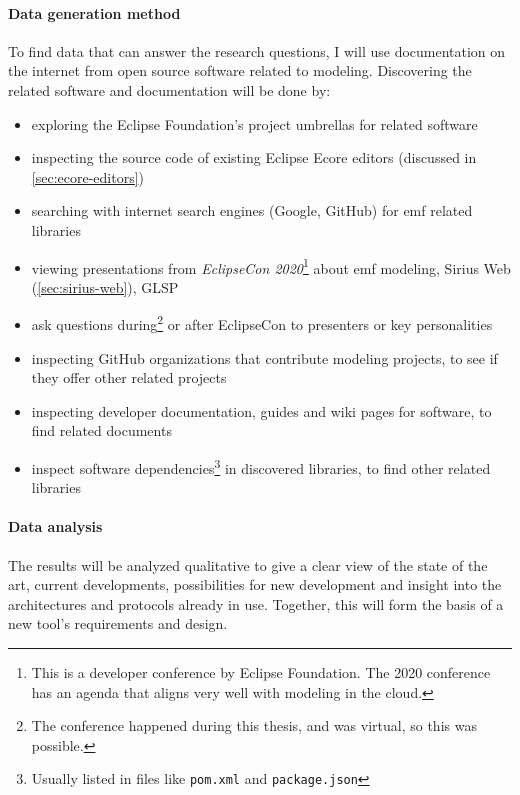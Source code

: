 \paragraph*{Data generation method}
To find data that can answer the research questions, I will use documentation on the internet from \gls{open source} software related to modeling.
Discovering the related software and documentation will be done by:
\begin{itemize}
  \item exploring the Eclipse Foundation's project umbrellas for related software
  \item inspecting the source code of existing \gls{Eclipse} \gls{Ecore} editors (discussed in \cref{sec:ecore-editors})
  \item searching with internet search engines (Google, GitHub) for \gls{emf} related libraries
  \item viewing presentations from \emph{EclipseCon 2020}\footnote{This is a developer conference by Eclipse Foundation. The 2020 conference has an agenda that aligns very well with modeling in the \gls{cloud}.} about \gls{emf} modeling, Sirius Web (\cref{sec:sirius-web}), \acrshort{GLSP}
  \item ask questions during\footnote{The conference happened during this thesis, and was virtual, so this was possible.} or after EclipseCon to presenters or key personalities 
  \item inspecting GitHub organizations that contribute modeling projects, to see if they offer other related projects
  \item inspecting developer documentation, guides and wiki pages for software, to find related documents
  \item inspect software dependencies\footnote{Usually listed in files like \texttt{pom.xml} and \texttt{package.json}} in discovered libraries, to find other related libraries 
\end{itemize}

\paragraph*{Data analysis}
The results will be analyzed qualitative to give a clear view of the state of the art, current developments, possibilities for new development and insight into the architectures and protocols already in use.
Together, this will form the basis of a new tool's requirements and design.








